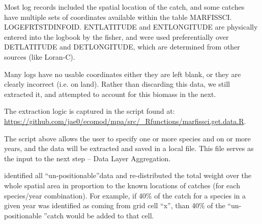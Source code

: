 \documentclass[letterpaper,portrait,11pt]{scrartcl}
\numberwithin{equation}{section}		%
\numberwithin{figure}{section}		%
\numberwithin{table}{section}				%
\begin{document}
Most log records included the spatial location of the catch, and some catches have multiple sets of coordinates available within the table MARFISSCI. LOG\textunderscore EFRT\textunderscore STD\textunderscore INFO\textunderscore ID.  ENT\textunderscore LATITUDE and ENT\textunderscore LONGITUDE are physically entered into the logbook by the fisher, and were used preferentially over DET\textunderscore LATITUDE  and DET\textunderscore LONGITUDE, which are determined from other sources (like Loran-C).  

Many logs have no usable coordinates \textendash  either they are left blank, or they are clearly incorrect (i.e. on land).  Rather than discarding this data, we still extracted it, and attempted to account for this biomass in the next.

The extraction logic is captured in the script found at:
\url{https://github.com/jae0/ecomod/mpa/src/\_Rfunctions/marfissci.get.data.R}.

The script above allows the user to specify one or more species and on or more years, and the data will be extracted and saved in a local file.  This file serves as the input to the next step – Data Layer Aggregation.

identified all \textquotedblleft un-positionable\textquotedblright  data and re-distributed the total weight over the whole spatial area in proportion to the known locations of catches (for each species/year combination).  For example, if 40\% of the catch for a species in a given year was identified as coming from grid cell \textquotedblleft x\textquotedblright, than 40\% of the \textquotedblleft un-positionable \textquotedblright catch would be added to that cell. 




\end{document}

